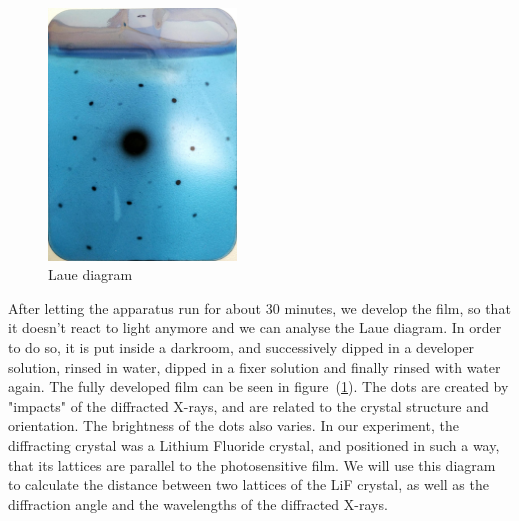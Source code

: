 \documentclass{scrartcl}
\begin{document}
\begin{figure}
    \centering
    \includegraphics[width=5cm]{Laue Diagram.jpg}
    \caption{Laue diagram}
    \label{fig:laueDiagram}
\end{figure}
After letting the apparatus run for about 30 minutes, we develop the film, so that it doesn't react to light anymore and we can analyse the Laue diagram. In order to do so, it is put inside a darkroom, and successively dipped in a developer solution, rinsed in water, dipped in a fixer solution and finally rinsed with water again. The fully developed film can be seen in figure~(\ref{fig:laueDiagram}). The dots are created by "impacts" of the diffracted X-rays, and are related to the crystal structure and orientation. The brightness of the dots also varies. In our experiment, the diffracting crystal was a Lithium Fluoride crystal, and positioned in such a way, that its lattices are parallel to the photosensitive film. We will use this diagram to calculate the distance between two lattices of the LiF crystal, as well as the diffraction angle and the wavelengths of the diffracted X-rays. \\
\end{document}
